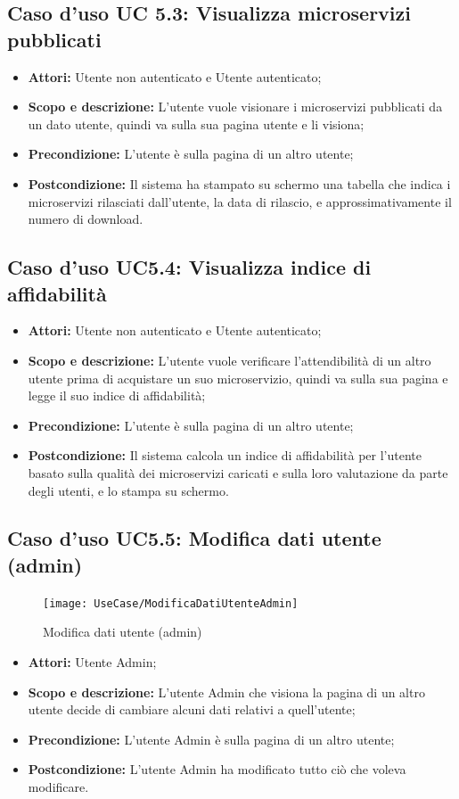 \documentclass[12pt,a4paper,titlepage]{article}
\begin{document}
\subsection{Caso d'uso UC 5.3: Visualizza microservizi pubblicati}
\begin{itemize}
	\item \textbf{Attori: }Utente non autenticato e Utente autenticato;
	\item \textbf{Scopo e descrizione: }L'utente vuole visionare i microservizi pubblicati da un dato utente, quindi va sulla sua pagina utente e li visiona;
	\item \textbf{Precondizione: }L'utente è sulla pagina di un altro utente;
	\item \textbf{Postcondizione: }Il sistema ha stampato su schermo una tabella che indica i microservizi rilasciati dall'utente, la data di rilascio, e approssimativamente il numero di download.
\end{itemize}
\subsection{Caso d'uso UC5.4: Visualizza indice di affidabilità}
\begin{itemize}
	\item \textbf{Attori: }Utente non autenticato e Utente autenticato;
	\item \textbf{Scopo e descrizione: }L'utente vuole verificare l'attendibilità di un altro utente prima di acquistare un suo microservizio, quindi va sulla sua pagina e legge il suo indice di affidabilità;
	\item \textbf{Precondizione: }L'utente è sulla pagina di un altro utente;
	\item \textbf{Postcondizione: }Il sistema calcola un indice di affidabilità per l'utente basato sulla qualità dei microservizi caricati e sulla loro valutazione da parte degli utenti, e lo stampa su schermo.
\end{itemize}
\subsection{Caso d'uso UC5.5: Modifica dati utente (admin)}
\begin{figure}[H]
	\centering
	\texttt{[image: UseCase/ModificaDatiUtenteAdmin]}
	\caption{Modifica dati utente (admin)}
\end{figure}
\begin{itemize}
	\item \textbf{Attori: }Utente Admin;
	\item \textbf{Scopo e descrizione: }L'utente Admin che visiona la pagina di un altro utente decide di cambiare alcuni dati relativi a quell'utente;
	\item \textbf{Precondizione: }L'utente Admin è sulla pagina di un altro utente;
	\item \textbf{Postcondizione: }L'utente Admin ha modificato tutto ciò che voleva modificare.
\end{itemize}
\end{document}
